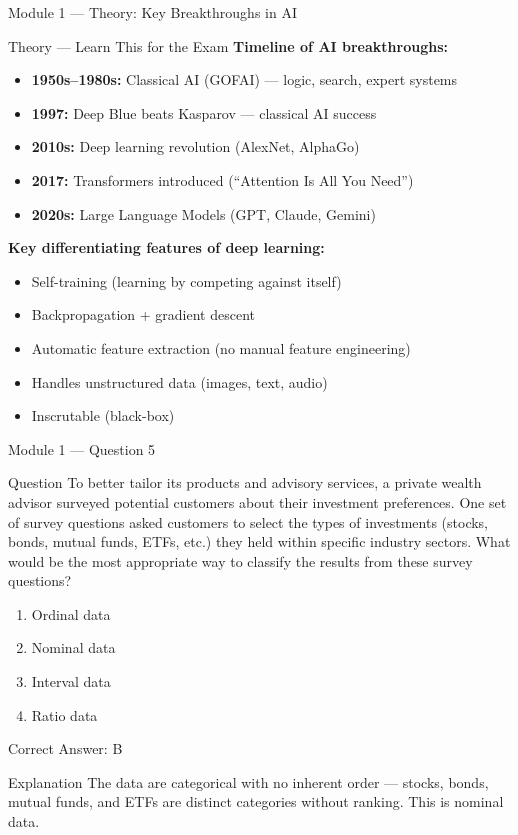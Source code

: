 \documentclass[aspectratio=169,10pt]{beamer}
\newcommand{\question}[1]{%
	\begin{block}{Question}
		#1
	\end{block}
}
\newcommand{\options}[4]{%
	\begin{enumerate}[label=\Alph*.,leftmargin=*]
		\item #1
		\item #2
		\item #3
		\item #4
	\end{enumerate}
}
\newcommand{\answerbox}[1]{%
	\begin{exampleblock}{Correct Answer: #1}
	\end{exampleblock}
}
\newcommand{\explain}[1]{%
	\begin{block}{Explanation}
		\small #1
	\end{block}
}
\newcommand{\theory}[1]{%
	\begin{block}{Theory --- Learn This for the Exam}
		\small #1
	\end{block}
}
\begin{document}
	\begin{frame}{Module 1 --- Theory: Key Breakthroughs in AI}
		\theory{
			\textbf{Timeline of AI breakthroughs:}
			\begin{itemize}
				\item \textbf{1950s--1980s:} Classical AI (GOFAI) --- logic, search, expert systems
				\item \textbf{1997:} Deep Blue beats Kasparov --- classical AI success
				\item \textbf{2010s:} Deep learning revolution (AlexNet, AlphaGo)
				\item \textbf{2017:} Transformers introduced (``Attention Is All You Need'')
				\item \textbf{2020s:} Large Language Models (GPT, Claude, Gemini)
			\end{itemize}
			\textbf{Key differentiating features of deep learning:}
			\begin{itemize}
				\item Self-training (learning by competing against itself)
				\item Backpropagation + gradient descent
				\item Automatic feature extraction (no manual feature engineering)
				\item Handles unstructured data (images, text, audio)
				\item Inscrutable (black-box)
			\end{itemize}
		}
	\end{frame}
	
	\begin{frame}{Module 1 --- Question 5}
		\question{To better tailor its products and advisory services, a private wealth advisor surveyed potential customers about their investment preferences. One set of survey questions asked customers to select the types of investments (stocks, bonds, mutual funds, ETFs, etc.) they held within specific industry sectors. What would be the most appropriate way to classify the results from these survey questions?}
		\options{Ordinal data}{Nominal data}{Interval data}{Ratio data}
		\answerbox{B}
		\explain{The data are categorical with no inherent order --- stocks, bonds, mutual funds, and ETFs are distinct categories without ranking. This is nominal data.}
	\end{frame}
	
\end{document}
